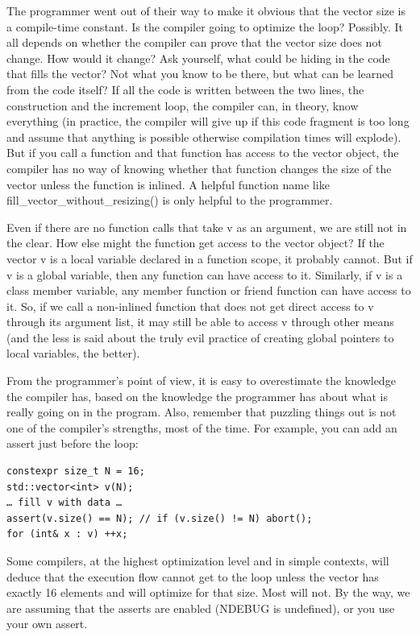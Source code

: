 The programmer went out of their way to make it obvious that the vector size is a compile-time constant. Is the compiler going to optimize the loop? Possibly. It all depends on whether the compiler can prove that the vector size does not change. How would it change? Ask yourself, what could be hiding in the code that fills the vector? Not what you know to be there, but what can be learned from the code itself? If all the code is written between the two lines, the construction and the increment loop, the compiler can, in theory, know everything (in practice, the compiler will give up if this code fragment is too long and assume that anything is possible otherwise compilation times will explode). But if you call a function and that function has access to the vector object, the compiler has no way of knowing whether that function changes the size of the vector unless the function is inlined. A helpful function name like fill\_vector\_without\_resizing() is only helpful to the programmer. 

Even if there are no function calls that take v as an argument, we are still not in the clear. How else might the function get access to the vector object? If the vector v is a local  variable declared in a function scope, it probably cannot. But if v is a global variable, then  any function can have access to it. Similarly, if v is a class member variable, any member  function or friend function can have access to it. So, if we call a non-inlined function that  does not get direct access to v through its argument list, it may still be able to access v through other means (and the less is said about the truly evil practice of creating global pointers to local variables, the better). 

From the programmer's point of view, it is easy to overestimate the knowledge the compiler has, based on the knowledge the programmer has about what is really going on in the program. Also, remember that puzzling things out is not one of the compiler's strengths, most of the time. For example, you can add an assert just before the loop:

\begin{lstlisting}[style=styleCXX]
constexpr size_t N = 16;
std::vector<int> v(N);
… fill v with data … 
assert(v.size() == N); // if (v.size() != N) abort();
for (int& x : v) ++x;
\end{lstlisting}

Some compilers, at the highest optimization level and in simple contexts, will deduce that the execution flow cannot get to the loop unless the vector has exactly 16 elements and will optimize for that size. Most will not. By the way, we are assuming that the asserts are enabled (NDEBUG is undefined), or you use your own assert.

